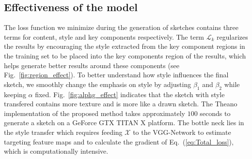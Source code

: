 \documentclass[10pt,twocolumn,letterpaper]{article}
\begin{document}

\subsection{Effectiveness of the model}

The loss function we minimize during the generation of sketches contains three terms for content, style and key components respectively. The term $\mathcal{L}_{k} $ regularizes the results by encouraging the style extracted from the key component regions in the training set to be placed into the key components region of the results, which helps generate better results around these components (see Fig.~\ref{fig:region_effect}). To better understand how style influences the final sketch, we smoothly change the emphasis on style by adjusting $\beta_1$ and $\beta_2$ while keeping $\alpha$  fixed. Fig.~\ref{fig:alphg_effect} indicates that the sketch with style transfered contains more texture and is more like a drawn sketch. The Theano implementation of the proposed method takes approximately $100$ seconds to generate a sketch on a GeForce GTX TITAN X platform. The bottle neck lies in the style transfer which requires feeding $\mathcal{X}$ to the VGG-Network to estimate targeting feature maps and to calculate the gradient of Eq.~(\ref{eq:Total_loss}), which is computationally intensive. 
\end{document}
